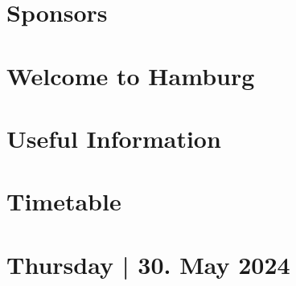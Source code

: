 \documentclass[openany, parskip=full, 12pt, a4]{scrbook}
\begin{document}

	
	
% 


\chapter{Sponsors}



\chapter{Welcome to Hamburg}



\tableofcontents


\chapter{Useful Information}



\chapter{Timetable}
% 





\chapter{Thursday | 30. May 2024}

\end{document}
